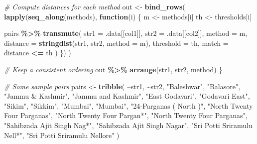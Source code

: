 \documentclass[
]{article}
\newenvironment{Shaded}{\begin{snugshade}}{\end{snugshade}}
\newcommand{\AttributeTok}[1]{\textcolor[rgb]{0.13,0.29,0.53}{#1}}
\newcommand{\CommentTok}[1]{\textcolor[rgb]{0.56,0.35,0.01}{\textit{#1}}}
\newcommand{\ControlFlowTok}[1]{\textcolor[rgb]{0.13,0.29,0.53}{\textbf{#1}}}
\newcommand{\FunctionTok}[1]{\textcolor[rgb]{0.13,0.29,0.53}{\textbf{#1}}}
\newcommand{\NormalTok}[1]{#1}
\newcommand{\OtherTok}[1]{\textcolor[rgb]{0.56,0.35,0.01}{#1}}
\newcommand{\SpecialCharTok}[1]{\textcolor[rgb]{0.81,0.36,0.00}{\textbf{#1}}}
\newcommand{\StringTok}[1]{\textcolor[rgb]{0.31,0.60,0.02}{#1}}
\begin{document}
\begin{Shaded}
\begin{Highlighting}[]
  \CommentTok{\# Compute distances for each method}
\NormalTok{  out }\OtherTok{\textless{}{-}} \FunctionTok{bind\_rows}\NormalTok{(}
    \FunctionTok{lapply}\NormalTok{(}\FunctionTok{seq\_along}\NormalTok{(methods), }\ControlFlowTok{function}\NormalTok{(i) \{}
\NormalTok{      m  }\OtherTok{\textless{}{-}}\NormalTok{ methods[i]}
\NormalTok{      th }\OtherTok{\textless{}{-}}\NormalTok{ thresholds[i]}
      
\NormalTok{      pairs }\SpecialCharTok{\%\textgreater{}\%}
        \FunctionTok{transmute}\NormalTok{(}
          \AttributeTok{str1 =}\NormalTok{ .data[[col1]],}
          \AttributeTok{str2 =}\NormalTok{ .data[[col2]],}
          \AttributeTok{method =}\NormalTok{ m,}
          \AttributeTok{distance =} \FunctionTok{stringdist}\NormalTok{(str1, str2, }\AttributeTok{method =}\NormalTok{ m),}
          \AttributeTok{threshold =}\NormalTok{ th,}
          \AttributeTok{match =}\NormalTok{ distance }\SpecialCharTok{\textless{}=}\NormalTok{ th}
\NormalTok{        )}
\NormalTok{    \})}
\NormalTok{  )}
  
  \CommentTok{\# Keep a consistent ordering}
\NormalTok{  out }\SpecialCharTok{\%\textgreater{}\%} \FunctionTok{arrange}\NormalTok{(str1, str2, method)}
\NormalTok{\}}

\CommentTok{\# Some sample pairs}
\NormalTok{pairs }\OtherTok{\textless{}{-}} \FunctionTok{tribble}\NormalTok{(}
  \SpecialCharTok{\textasciitilde{}}\NormalTok{str1, }\SpecialCharTok{\textasciitilde{}}\NormalTok{str2,}
  \StringTok{"Baleshwar"}\NormalTok{, }\StringTok{"Balasore"}\NormalTok{,}
  \StringTok{"Jammu \& Kashmir"}\NormalTok{, }\StringTok{"Jammu and Kashmir"}\NormalTok{,}
  \StringTok{"East Godavari"}\NormalTok{, }\StringTok{"Godavari East"}\NormalTok{,}
  \StringTok{"Sikim"}\NormalTok{, }\StringTok{"Sikkim"}\NormalTok{,}
  \StringTok{"Mumbai"}\NormalTok{, }\StringTok{"Mumbai"}\NormalTok{,}
  \StringTok{"24{-}Parganas ( North )"}\NormalTok{, }\StringTok{"North Twenty Four Parganas"}\NormalTok{,}
  \StringTok{"North Twenty Four Pargan*"}\NormalTok{, }\StringTok{"North Twenty Four Parganas"}\NormalTok{,}
  \StringTok{"Sahibzada Ajit Singh Nag*"}\NormalTok{, }\StringTok{"Sahibzada Ajit Singh Nagar"}\NormalTok{,}
  \StringTok{"Sri Potti Sriramulu Nell*"}\NormalTok{, }\StringTok{"Sri Potti Sriramulu Nellore"}
\NormalTok{)}



\end{Highlighting}
\end{Shaded}
\end{document}
